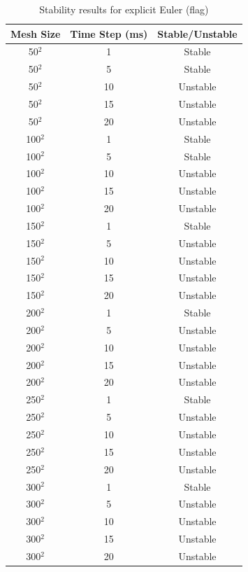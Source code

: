 \begin{table}[tp]
   \begin{minipage}{\textwidth}
      \begin{center}
         \begin{tabular}{|c|c|c|} \hline
           Mesh Size & Time Step (ms) & Stable/Unstable\\
           \hline
           50$^{2}$ & 1 & Stable\\ \hline
           50$^{2}$ & 5 & Stable\\ \hline
           50$^{2}$ & 10 & Unstable\\ \hline
           50$^{2}$ & 15 & Unstable\\ \hline
           50$^{2}$ & 20 & Unstable\\ \hline
           100$^{2}$ & 1 & Stable\\ \hline
           100$^{2}$ & 5 & Stable\\ \hline
           100$^{2}$ & 10 & Unstable\\ \hline
           100$^{2}$ & 15 & Unstable\\ \hline
           100$^{2}$ & 20 & Unstable\\ \hline           
           150$^{2}$ & 1 & Stable\\ \hline
           150$^{2}$ & 5 & Unstable\\ \hline
           150$^{2}$ & 10 & Unstable\\ \hline
           150$^{2}$ & 15 & Unstable\\ \hline
           150$^{2}$ & 20 & Unstable\\ \hline           
           200$^{2}$ & 1 & Stable\\ \hline
           200$^{2}$ & 5 & Unstable\\ \hline
           200$^{2}$ & 10 & Unstable\\ \hline
           200$^{2}$ & 15 & Unstable\\ \hline
           200$^{2}$ & 20 & Unstable\\ \hline           
           250$^{2}$ & 1 & Stable\\ \hline
           250$^{2}$ & 5 & Unstable\\ \hline
           250$^{2}$ & 10 & Unstable\\ \hline
           250$^{2}$ & 15 & Unstable\\ \hline
           250$^{2}$ & 20 & Unstable\\ \hline           
           300$^{2}$ & 1 & Stable\\ \hline
           300$^{2}$ & 5 & Unstable\\ \hline
           300$^{2}$ & 10 & Unstable\\ \hline
           300$^{2}$ & 15 & Unstable\\ \hline
           300$^{2}$ & 20 & Unstable\\ \hline
         \end{tabular}
      \end{center}
   \end{minipage}
   \caption{Stability results for explicit Euler (flag)}
   \label{tab:ee stability flag}
\end{table}

